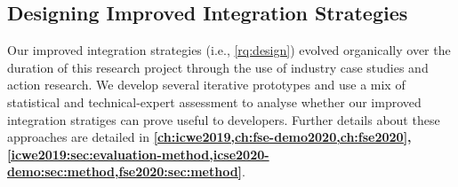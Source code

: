 \subsection{Designing Improved Integration Strategies}

Our improved integration strategies (i.e., \ref{rq:design}) evolved organically over the duration of this research project through the use of industry case studies and action research. We develop several iterative prototypes and use a mix of statistical and technical-expert assessment to analyse whether our improved integration stratiges can prove useful to developers. Further details about these approaches are detailed in \textbf{\cref{ch:icwe2019,ch:fse-demo2020,ch:fse2020}, \cref{icwe2019:sec:evaluation-method,icse2020-demo:sec:method,fse2020:sec:method}}. 
